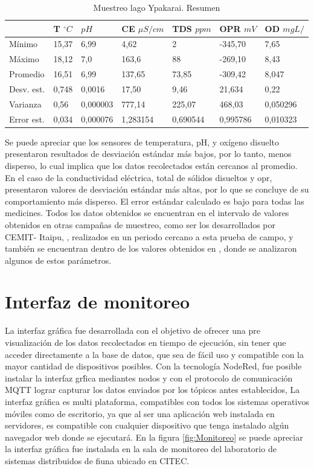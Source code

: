 \begin{table}[H]
\caption{Muestreo lago Ypakarai. Resumen}
\label{tab:datos Lago}
\begin{tabular}{lllllll} \hline& 
T  $^{\circ}C$ & $pH$     & CE $\mu S/cm$ & TDS $ppm$ & OPR $mV$ & OD $mgL/$  \\ \hline
M\'inimo & 15,37 & 6,99 & 4,62 & 2    & -345,70  & 7,65     \\
M\'aximo & 18,12 & 7,0   & 163,6    & 88    & -269,10  & 8,43 \\
Promedio & 16,51  & 6,99 & 137,65 & 73,85 & -309,42  & 8,047 \\
Desv. est. & 0,748 & 0,0016   & 17,50   & 9,46     & 21,634   & 0,22     \\
Varianza                & 0,56           & 0,000003 & 777,14        & 225,07    & 468,03   & 0,050296 \\
Error est.               & 0,034 & 0,000076 & 1,283154 & 0,690544 & 0,995786 & 0,010323 \\
\hline
\end{tabular}
\end{table}

Se puede apreciar que los sensores de temperatura, pH, y ox\'igeno disuelto presentaron resultados de desviación estándar m\'as bajos, por lo tanto, menos disperso, lo cual implica que los datos recolectados están cercanos al promedio. En el caso de la conductividad eléctrica, total de s\'olidos disueltos y opr, presentaron valores de desviación estándar m\'as altas, por lo que se concluye de su comportamiento m\'as disperso.
El error estándar calculado es bajo para todas las medicines. 
Todos los datos obtenidos se encuentran en el intervalo de valores obtenidos en otras campa\~nas de muestreo, como ser los desarrollados por CEMIT- Itaipu, \cite{3er_Cemit}\cite{4to_Cemit}, realizados en un periodo cercano a esta prueba de campo, y también se encuentran dentro de los valores obtenidos en \cite{lopez_moreira_m_eutrophication_2018}, donde se analizaron algunos de estos parámetros.  

\section{Interfaz de monitoreo}
La interfaz gr\'afica fue desarrollada con el objetivo de ofrecer una pre visualizaci\'on de los datos recolectados en tiempo de ejecuci\'on, sin tener que acceder directamente a la base de datos, que sea de f\'acil uso y compatible con la mayor cantidad de dispositivos posibles.
Con la tecnolog\'ia NodeRed, fue posible instalar la interfaz gr\'fica mediantes nodos y con el protocolo de comunicaci\'on  MQTT lograr capturar los datos enviados por los t\'opicos antes  establecidos, 
La interfaz gr\'afica es multi plataforma, compatibles con todos los sistemas operativos m\'oviles como de escritorio, ya que al ser una aplicaci\'on web instalada en servidores, es compatible con cualquier dispositivo que tenga instalado alg\'un navegador web donde se ejecutará. 
En la figura \ref{fig:Monitoreo} se puede apreciar la interfaz gráfica fue instalada en la sala de monitoreo del laboratorio de sistemas distribuidos de fiuna ubicado en CITEC. 

